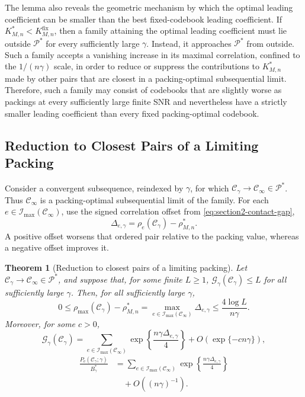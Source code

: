 \documentclass[12pt,draftclsnofoot,onecolumn]{IEEEtran}
\newcommand{\cC}{\mathcal{C}}
\newcommand{\cG}{\mathcal{G}}
\newcommand{\cI}{\mathcal{I}}
\newcommand{\cP}{\mathcal{P}}
\newcommand{\Pe}{P_{\mathrm e}}
\newtheorem{theorem}{Theorem}
\theoremstyle{definition}
\begin{document}
The lemma also reveals the geometric mechanism by
which the optimal leading coefficient can be smaller than the best
fixed-codebook leading coefficient.  If
\(K^{\ast}_{M,n}<K^{\mathrm{fix}}_{M,n}\), then a family attaining the
optimal leading coefficient must lie outside \(\cP^{\ast}\) for every
sufficiently large \(\gamma\).  Instead, it approaches
\(\cP^{\ast}\) from outside.  Such a family accepts a vanishing increase
in its maximal correlation, confined to the \(1/(n\gamma)\) scale, in order
to reduce or suppress the contributions to \(K^{\ast}_{M,n}\) made by other
pairs that are closest in a packing-optimal subsequential limit.  Therefore, such a
family may consist of codebooks that are slightly worse as packings at
every sufficiently large finite SNR and nevertheless have a strictly smaller leading
coefficient than every fixed packing-optimal codebook.

\subsection{Reduction to Closest Pairs of a Limiting Packing}
\label{subsec:packing-contact-reduction}

Consider a convergent subsequence, reindexed by \(\gamma\), for which
\(\cC_\gamma\to\cC_\infty\in\cP^{\ast}\).  Thus
\(\cC_\infty\) is a packing-optimal subsequential limit of the family.  For each
\(e\in\cI_{\max}(\cC_\infty)\), use the signed correlation offset from
\eqref{eq:section2-contact-gap},
\begin{equation*}
  \Delta_{e,\gamma}
  =\rho_e(\cC_\gamma)-\rho^{\ast}_{M,n}.
\end{equation*}
A positive offset worsens that ordered pair relative to the packing
value, whereas a negative offset improves it.

\begin{theorem}[Reduction to closest pairs of a limiting packing]
\label{thm:packing-contact-reduction}
Let \(\cC_\gamma\to\cC_\infty\in\cP^{\ast}\), and suppose that, for
some finite \(L\geq1\),
\(\cG_\gamma(\cC_\gamma)\le L\) for all sufficiently large \(\gamma\).
Then, for all sufficiently large \(\gamma\),
\begin{equation*}
  0\le
  \rho_{\max}(\cC_\gamma)-\rho^{\ast}_{M,n}
  =\max_{e\in\cI_{\max}(\cC_\infty)}\Delta_{e,\gamma}
  \le\frac{4\log L}{n\gamma}.
\end{equation*}
Moreover, for some \(c>0\),
\begin{equation}
  \cG_\gamma(\cC_\gamma)
  =
  \sum_{e\in\cI_{\max}(\cC_\infty)}
  \exp\left\{\frac{n\gamma\Delta_{e,\gamma}}4\right\}
  +O(\exp\{-c n\gamma\}),
  \label{eq:packing-contact-energy-reduction}
\end{equation}
\begin{equation}
\begin{split}
  \frac{\Pe(\cC_\gamma;\gamma)}{B_\gamma^{\ast}}
  &={}
  \sum_{e\in\cI_{\max}(\cC_\infty)}
  \exp\left\{\frac{n\gamma\Delta_{e,\gamma}}4\right\}\\
  &\quad+O((n\gamma)^{-1}).
\end{split}
  \label{eq:packing-contact-error-reduction}
\end{equation}
\end{theorem}
\end{document}
